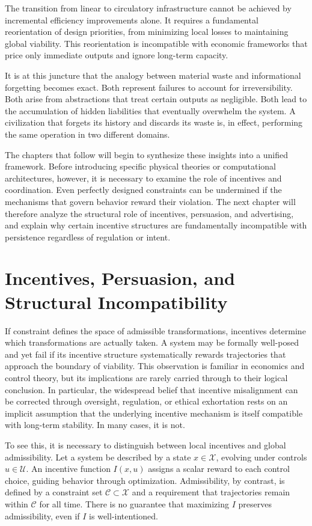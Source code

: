 \documentclass[12pt,oneside]{book}
\begin{document}
The transition from linear to circulatory infrastructure cannot be achieved by incremental efficiency improvements alone. It requires a fundamental reorientation of design priorities, from minimizing local losses to maintaining global viability. This reorientation is incompatible with economic frameworks that price only immediate outputs and ignore long-term capacity.

It is at this juncture that the analogy between material waste and informational forgetting becomes exact. Both represent failures to account for irreversibility. Both arise from abstractions that treat certain outputs as negligible. Both lead to the accumulation of hidden liabilities that eventually overwhelm the system. A civilization that forgets its history and discards its waste is, in effect, performing the same operation in two different domains.

The chapters that follow will begin to synthesize these insights into a unified framework. Before introducing specific physical theories or computational architectures, however, it is necessary to examine the role of incentives and coordination. Even perfectly designed constraints can be undermined if the mechanisms that govern behavior reward their violation. The next chapter will therefore analyze the structural role of incentives, persuasion, and advertising, and explain why certain incentive structures are fundamentally incompatible with persistence regardless of regulation or intent.

\chapter{Incentives, Persuasion, and Structural Incompatibility}

If constraint defines the space of admissible transformations, incentives determine which transformations are actually taken. A system may be formally well-posed and yet fail if its incentive structure systematically rewards trajectories that approach the boundary of viability. This observation is familiar in economics and control theory, but its implications are rarely carried through to their logical conclusion. In particular, the widespread belief that incentive misalignment can be corrected through oversight, regulation, or ethical exhortation rests on an implicit assumption that the underlying incentive mechanism is itself compatible with long-term stability. In many cases, it is not.

To see this, it is necessary to distinguish between local incentives and global admissibility. Let a system be described by a state \(x \in \mathcal{X}\), evolving under controls \(u \in \mathcal{U}\). An incentive function \(I(x,u)\) assigns a scalar reward to each control choice, guiding behavior through optimization. Admissibility, by contrast, is defined by a constraint set \(\mathcal{C} \subset \mathcal{X}\) and a requirement that trajectories remain within \(\mathcal{C}\) for all time. There is no guarantee that maximizing \(I\) preserves admissibility, even if \(I\) is well-intentioned.
\end{document}
